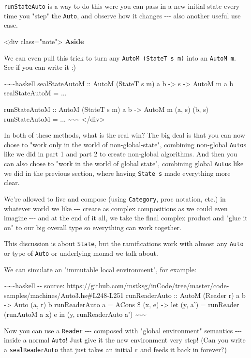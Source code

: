 \documentclass[]{article}
\begin{document}
\texttt{runStateAuto} is a way to do this were you can pass in a new initial
state every time you "step" the \texttt{Auto}, and observe how it changes
-\/-\/- also another useful use case.

\textless{}div class="note"\textgreater{} \textbf{Aside}

We can even pull this trick to turn any \texttt{AutoM\ (StateT\ s\ m)} into an
\texttt{AutoM\ m}. See if you can write it :)

\textasciitilde{}\textasciitilde{}\textasciitilde{}haskell sealStateAutoM ::
AutoM (StateT s m) a b -\textgreater{} s -\textgreater{} AutoM m a b
sealStateAutoM = ...

runStateAutoM :: AutoM (StateT s m) a b -\textgreater{} AutoM m (a, s) (b, s)
runStateAutoM = ... \textasciitilde{}\textasciitilde{}\textasciitilde{}
\textless{}/div\textgreater{}

In both of these methods, what is the real win? The big deal is that you can now
chose to "work only in the world of non-global-state", combining non-global
\texttt{Auto}s like we did in part 1 and part 2 to create non-global algorithms.
And then you can also chose to "work in the world of global state", combining
global \texttt{Auto}s like we did in the previous section, where having
\texttt{State\ s} made everything more clear.

We're allowed to live and compose (using \texttt{Category}, proc notation, etc.)
in whatever world we like -\/-\/- create as complex compositions as we could
even imagine -\/-\/- and at the end of it all, we take the final complex product
and "glue it on" to our big overall type so everything can work together.

This discussion is about \texttt{State}, but the ramifications work with almost
any \texttt{Auto} or type of \texttt{Auto} or underlying monad we talk about.

We can simulate an "immutable local environment", for example:

\textasciitilde{}\textasciitilde{}\textasciitilde{}haskell -\/- source:
https://github.com/mstksg/inCode/tree/master/code-samples/machines/Auto3.hs\#L248-L251
runReaderAuto :: AutoM (Reader r) a b -\textgreater{} Auto (a, r) b
runReaderAuto a = ACons \$ (x, e) -\textgreater{} let (y, a') = runReader
(runAutoM a x) e in (y, runReaderAuto a')
\textasciitilde{}\textasciitilde{}\textasciitilde{}

Now you can use a \texttt{Reader} -\/-\/- composed with "global environment"
semantics -\/-\/- inside a normal \texttt{Auto}! Just give it the new
environment very step! (Can you write a \texttt{sealReaderAuto} that just takes
an initial \texttt{r} and feeds it back in forever?)
\end{document}
